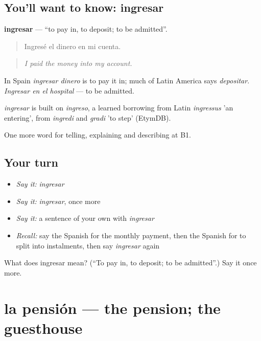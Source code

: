 \subsection*{You'll want to know: ingresar}
\textbf{ingresar} — \textquotedblleft{}to pay in, to deposit; to be admitted\textquotedblright{}.

\begin{quote}
Ingresé el dinero en mi cuenta.
\end{quote}

\begin{quote}
\emph{I paid the money into my account.}
\end{quote}

In Spain \emph{ingresar dinero} is to pay it in; much of Latin America says \emph{depositar}. \emph{Ingresar en el hospital} — to be admitted.

\begin{cousinweb}
\emph{ingresar} is built on \emph{ingreso}, a learned borrowing from Latin \emph{ingressus} 'an entering', from \emph{ingredi} and \emph{gradi} 'to step' (EtymDB).
\end{cousinweb}

\begin{grammarlens}[title={What you've built}]
One more word for telling, explaining and describing at B1.
\end{grammarlens}

\subsection*{Your turn}
\begin{itemize}
\raggedright
  \item \emph{Say it:} \emph{ingresar}
  \item \emph{Say it:} \emph{ingresar}, once more
  \item \emph{Say it:} a sentence of your own with \emph{ingresar}
  \item \emph{Recall:} say the Spanish for the monthly payment, then the Spanish for to split into instalments, then say \emph{ingresar} again
\end{itemize}

\begin{tcolorbox}[breakable,colback=teal!4,colframe=teal!35!black,title={Before you move on}]
What does ingresar mean? (\textquotedblleft{}To pay in, to deposit; to be admitted\textquotedblright{}.) Say it once more.
\end{tcolorbox}
\section[la pensión]{la pensión — the pension; the guesthouse}


